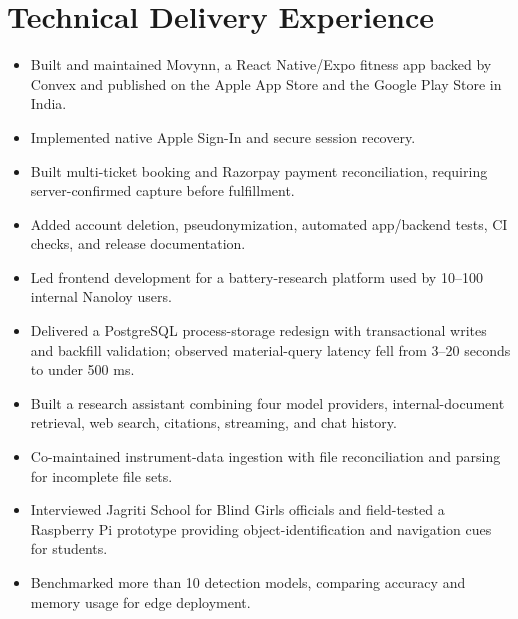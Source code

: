 \section{Technical Delivery Experience}
\begin{itemize}
  \item Built and maintained Movynn, a React Native/Expo fitness app backed by Convex and published on the Apple App Store and the Google Play Store in India.
  \item Implemented native Apple Sign-In and secure session recovery.
  \item Built multi-ticket booking and Razorpay payment reconciliation, requiring server-confirmed capture before fulfillment.
  \item Added account deletion, pseudonymization, automated app/backend tests, CI checks, and release documentation.
\end{itemize}
\begin{itemize}
  \item Led frontend development for a battery-research platform used by 10--100 internal Nanoloy users.
  \item Delivered a PostgreSQL process-storage redesign with transactional writes and backfill validation; observed material-query latency fell from 3--20 seconds to under 500 ms.
  \item Built a research assistant combining four model providers, internal-document retrieval, web search, citations, streaming, and chat history.
  \item Co-maintained instrument-data ingestion with file reconciliation and parsing for incomplete file sets.
\end{itemize}
\begin{itemize}
  \item Interviewed Jagriti School for Blind Girls officials and field-tested a Raspberry Pi prototype providing object-identification and navigation cues for students.
  \item Benchmarked more than 10 detection models, comparing accuracy and memory usage for edge deployment.
\end{itemize}
